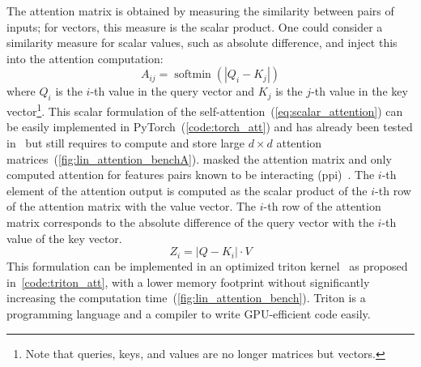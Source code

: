 \documentclass[../main.tex]{subfiles}
\begin{document}
		The attention matrix is obtained by measuring the similarity between pairs of inputs; for vectors, this measure is the scalar product.
		One could consider a similarity measure for scalar values, such as absolute difference, and inject this into the attention computation:
		\begin{equation}
			A_{ij} = \operatorname{softmin}\left(\left|Q_{i} - K_{j} \right| \right) \label{eq:scalar_attention}
		\end{equation}
		where \(Q_{i}\) is the \(i\)-th value in the query vector and \(K_{j}\) is the \(j\)-th value in the key vector\footnote{Note that queries, keys, and values are no longer matrices but vectors.}.
		This scalar formulation of the self-attention~(\cref{eq:scalar_attention}) can be easily implemented in PyTorch~(\cref{code:torch_att}) and has already been tested in~\cite{Lacan2023} but still requires to compute and store large \(d\times d\) attention matrices~(\cref{fig:lin_attention_benchA}).
		\citeauthor{Lacan2023} masked the attention matrix and only computed attention for features pairs known to be interacting (\gls{ppi})~\cite{Lacan2023}.
		The \(i\)-th element of the attention output is computed as the scalar product of the \(i\)-th row of the attention matrix with the value vector.
		The \(i\)-th row of the attention matrix corresponds to the absolute difference of the query vector with the \(i\)-th value of the key vector.
		\begin{equation}
			Z_{i} = \left| Q - K_{i} \right| \cdot V
		\end{equation}
		This formulation can be implemented in an optimized triton kernel~\cite{TritonLang} as proposed in~\cref{code:triton_att}, with a lower memory footprint without significantly increasing the computation time~(\cref{fig:lin_attention_bench}).
		Triton is a programming language and a compiler to write GPU-efficient code easily.
\end{document}
